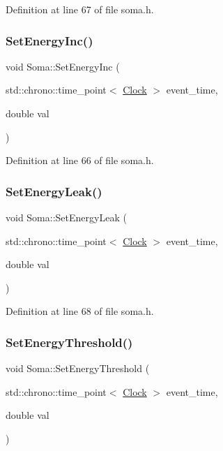 Definition at line 67 of file soma.\+h.

\mbox{\label{class_soma_a414afd7eb780e29a432603198a9838ed}} 
\subsubsection{\texorpdfstring{Set\+Energy\+Inc()}{SetEnergyInc()}}
{\footnotesize\ttfamily void Soma\+::\+Set\+Energy\+Inc (\begin{DoxyParamCaption}\item[{std\+::chrono\+::time\+\_\+point$<$ \hyperlink{universe_8h_a0ef8d951d1ca5ab3cfaf7ab4c7a6fd80}{Clock} $>$}]{event\+\_\+time,  }\item[{double}]{val }\end{DoxyParamCaption})\hspace{0.3cm}{\ttfamily [inline]}}



Definition at line 66 of file soma.\+h.

\mbox{\label{class_soma_abca59a00940ca2d9c005a84b6785c12f}} 
\subsubsection{\texorpdfstring{Set\+Energy\+Leak()}{SetEnergyLeak()}}
{\footnotesize\ttfamily void Soma\+::\+Set\+Energy\+Leak (\begin{DoxyParamCaption}\item[{std\+::chrono\+::time\+\_\+point$<$ \hyperlink{universe_8h_a0ef8d951d1ca5ab3cfaf7ab4c7a6fd80}{Clock} $>$}]{event\+\_\+time,  }\item[{double}]{val }\end{DoxyParamCaption})\hspace{0.3cm}{\ttfamily [inline]}}



Definition at line 68 of file soma.\+h.

\mbox{\label{class_soma_ae2876b37909f37e8922ce364eb06491f}} 
\subsubsection{\texorpdfstring{Set\+Energy\+Threshold()}{SetEnergyThreshold()}}
{\footnotesize\ttfamily void Soma\+::\+Set\+Energy\+Threshold (\begin{DoxyParamCaption}\item[{std\+::chrono\+::time\+\_\+point$<$ \hyperlink{universe_8h_a0ef8d951d1ca5ab3cfaf7ab4c7a6fd80}{Clock} $>$}]{event\+\_\+time,  }\item[{double}]{val }\end{DoxyParamCaption})\hspace{0.3cm}{\ttfamily [inline]}}



